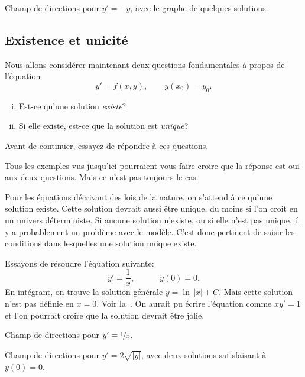 \begin{myfig}
	\capstart
	\caption{Champ de directions pour $y' = -y$, avec le graphe de quelques solutions.\label{1.3:fig3}}
\end{myfig}



\subsection{Existence et unicité}

Nous allons considérer maintenant deux questions fondamentales à propos de l'équation
\begin{equation*}
	y' = f(x,y), \qquad y(x_0) = y_0.
\end{equation*}
\begin{enumerate}[(i)]
	\item Est-ce qu'une solution \emph{existe}?
	\item Si elle existe, est-ce que la solution est \emph{unique}?
\end{enumerate}
Avant de continuer, essayez de répondre à ces questions.

Tous les exemples vus jusqu'ici pourraient vous faire croire que la réponse est \og{}oui\fg{} aux deux questions.
Mais ce n'est pas toujours le cas.

Pour les équations décrivant des lois de la nature, on s'attend à ce qu'une solution existe.
Cette solution devrait aussi être unique, du moins si l'on croit en un univers déterministe.
Si aucune solution n'existe, ou si elle n'est pas unique, il y a probablement un problème avec le modèle.
C'est donc pertinent de saisir les conditions dans lesquelles une solution unique existe.


\begin{example}
	Essayons de résoudre l'équation suivante:
	\begin{equation*}
		y' = \frac{1}{x}, \quad \qquad  y(0) = 0 .
	\end{equation*}
	En intégrant, on trouve la solution générale $y = \ln \, \lvert x \rvert + C$.
	Mais cette solution n'est pas définie en $x=0$.  Voir la~.
	On aurait pu écrire l'équation comme $x y' = 1$ et l'on pourrait croire que la solution \og{}devrait être jolie\fg{}.

	\begin{myfig}
		\parbox[t]{3in}{
		 \capstart {}
		 \caption{Champ de directions pour $y' = \nicefrac{1}{x}$.\label{1.3:xinvfig}}
		}
		\quad
		\parbox[t]{3in}{
		 \capstart {}
		 \caption{Champ de directions pour $y' = 2 \sqrt{\lvert y \rvert}$, avec deux solutions satisfaisant à $y(0) = 0$.\label{1.3:sqrtfig}}
		}
	\end{myfig}
\end{example}

